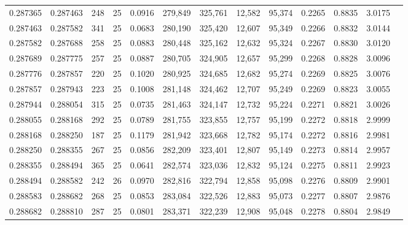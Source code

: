 \begin{tabular}{rrrrrrrrrrrrr}
0.287365 & 0.287463 &   248 &  25 &                                     0.0916 & 279,849 & 325,761 &  12,582 &  95,374 & 0.2265 & 0.8835 & 3.0175 \\
0.287463 & 0.287582 &   341 &  25 &                                     0.0683 & 280,190 & 325,420 &  12,607 &  95,349 & 0.2266 & 0.8832 & 3.0144 \\
0.287582 & 0.287688 &   258 &  25 &                                     0.0883 & 280,448 & 325,162 &  12,632 &  95,324 & 0.2267 & 0.8830 & 3.0120 \\
0.287689 & 0.287775 &   257 &  25 &                                     0.0887 & 280,705 & 324,905 &  12,657 &  95,299 & 0.2268 & 0.8828 & 3.0096 \\
0.287776 & 0.287857 &   220 &  25 &                                     0.1020 & 280,925 & 324,685 &  12,682 &  95,274 & 0.2269 & 0.8825 & 3.0076 \\
0.287857 & 0.287943 &   223 &  25 &                                     0.1008 & 281,148 & 324,462 &  12,707 &  95,249 & 0.2269 & 0.8823 & 3.0055 \\
0.287944 & 0.288054 &   315 &  25 &                                     0.0735 & 281,463 & 324,147 &  12,732 &  95,224 & 0.2271 & 0.8821 & 3.0026 \\
0.288055 & 0.288168 &   292 &  25 &                                     0.0789 & 281,755 & 323,855 &  12,757 &  95,199 & 0.2272 & 0.8818 & 2.9999 \\
0.288168 & 0.288250 &   187 &  25 &                                     0.1179 & 281,942 & 323,668 &  12,782 &  95,174 & 0.2272 & 0.8816 & 2.9981 \\
0.288250 & 0.288355 &   267 &  25 &                                     0.0856 & 282,209 & 323,401 &  12,807 &  95,149 & 0.2273 & 0.8814 & 2.9957 \\
0.288355 & 0.288494 &   365 &  25 &                                     0.0641 & 282,574 & 323,036 &  12,832 &  95,124 & 0.2275 & 0.8811 & 2.9923 \\
0.288494 & 0.288582 &   242 &  26 &                                     0.0970 & 282,816 & 322,794 &  12,858 &  95,098 & 0.2276 & 0.8809 & 2.9901 \\
0.288583 & 0.288682 &   268 &  25 &                                     0.0853 & 283,084 & 322,526 &  12,883 &  95,073 & 0.2277 & 0.8807 & 2.9876 \\
0.288682 & 0.288810 &   287 &  25 &                                     0.0801 & 283,371 & 322,239 &  12,908 &  95,048 & 0.2278 & 0.8804 & 2.9849 \\

\end{tabular}
